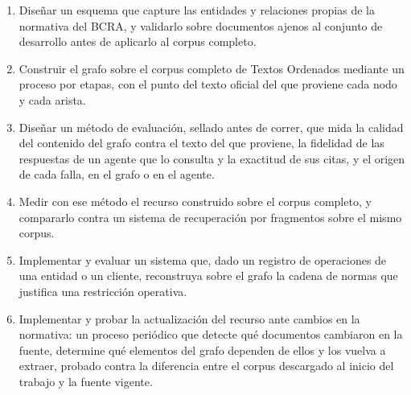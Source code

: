 \documentclass[12pt,a4paper]{report}
\begin{document}
\begin{enumerate}
  \item Diseñar un esquema que capture las entidades y relaciones propias de la normativa del BCRA, y validarlo sobre documentos ajenos al conjunto de desarrollo antes de aplicarlo al corpus completo.

  \item Construir el grafo sobre el corpus completo de Textos Ordenados mediante un proceso por etapas, con el punto del texto oficial del que proviene cada nodo y cada arista.

  \item Diseñar un método de evaluación, sellado antes de correr, que mida la calidad del contenido del grafo contra el texto del que proviene, la fidelidad de las respuestas de un agente que lo consulta y la exactitud de sus citas, y el origen de cada falla, en el grafo o en el agente.

  \item Medir con ese método el recurso construido sobre el corpus completo, y compararlo contra un sistema de recuperación por fragmentos sobre el mismo corpus.

  \item Implementar y evaluar un sistema que, dado un registro de operaciones de una entidad o un cliente, reconstruya sobre el grafo la cadena de normas que justifica una restricción operativa.
  
  \item Implementar y probar la actualización del recurso ante cambios en la normativa: un proceso periódico que detecte qué documentos cambiaron en la fuente, determine qué elementos del grafo dependen de ellos y los vuelva a extraer, probado contra la diferencia entre el corpus descargado al inicio del trabajo y la fuente vigente.
\end{enumerate}
\end{document}
